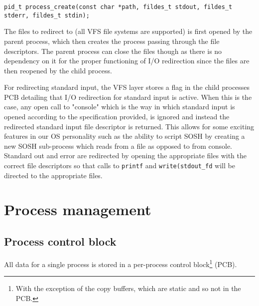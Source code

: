 \documentclass[12pt,english]{article}
\begin{document}
\begin{verbatim}
pid_t process_create(const char *path, fildes_t stdout, fildes_t stderr, fildes_t stdin);
\end{verbatim}

The files to redirect to (all VFS file systems are supported) is first opened by the parent process, which then creates the process passing through the file descriptors. The parent process can close the files though as there is no dependency on it for the proper functioning of I/O redirection since the files are then reopened by the child process.

For redirecting standard input, the VFS layer stores a flag in the child processes PCB detailing that I/O redirection for standard input is active. When this is the case, any open call to "console" which is the way in which standard input is opened according to the specification provided, is ignored and instead the redirected standard input file descriptor is returned. This allows for some exciting features in our OS personality such as the ability to script SOSH by creating a new SOSH sub-process which reads from a file as opposed to from console. Standard out and error are redirected by opening the appropriate files with the correct file descriptors so that calls to \texttt{printf} and \texttt{write(stdout\_fd} will be directed to the appropriate files.



\newpage{}
\section{Process management}

\subsection{Process control block}

All data for a single process is stored in a per-process control block\footnote{With the exception of the copy buffers, which are static and so not in the PCB.} (PCB).
\end{document}

